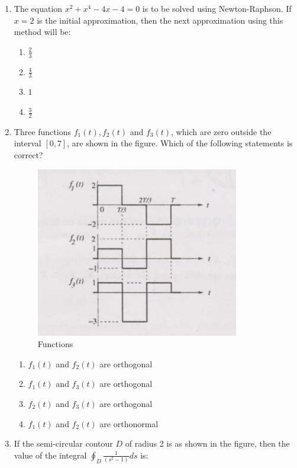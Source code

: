\documentclass[journal,12pt,onecolumn]{IEEEtran}
\theoremstyle{remark}
\begin{document}
\begin{enumerate}
\item The equation $x^2 + x^4 - 4x - 4 = 0$ is to be solved using Newton-Raphson. If $x = 2$ is the initial approximation, then the next approximation using this method will be:
\hfill{}

\begin{multicols}{4}
\begin{enumerate}
    \item $\frac{2}{3}$
    \item $\frac{4}{3}$
    \item $1$
    \item $\frac{3}{2}$   
\end{enumerate}
\end{multicols}

\item Three functions $f_1(t), f_2(t)$ and $f_3(t)$, which are zero outside the interval $[0,7]$, are shown in the figure. Which of the following statements is correct? 

\begin{figure}[H]
    \centering
    \includegraphics[width=0.5\linewidth]{Q26.png}
    \caption{Functions}
    \label{fig:full_wave}
\end{figure}

\hfill{}
\begin{enumerate}[label=(\Alph*)]
    \item $f_1(t)$ and $f_2(t)$ are orthogonal
    \item $f_1(t)$ and $f_3(t)$ are orthogonal
    \item $f_2(t)$ and $f_3(t)$ are orthogonal
    \item $f_1(t)$ and $f_2(t)$ are orthonormal
\end{enumerate}

\item If the semi-circular contour $D$ of radius 2 is as shown in the figure, then the value of the integral $\displaystyle \oint_D \frac{1}{(s^2 -1)} ds$ is: 


\end{enumerate}
\end{document}
